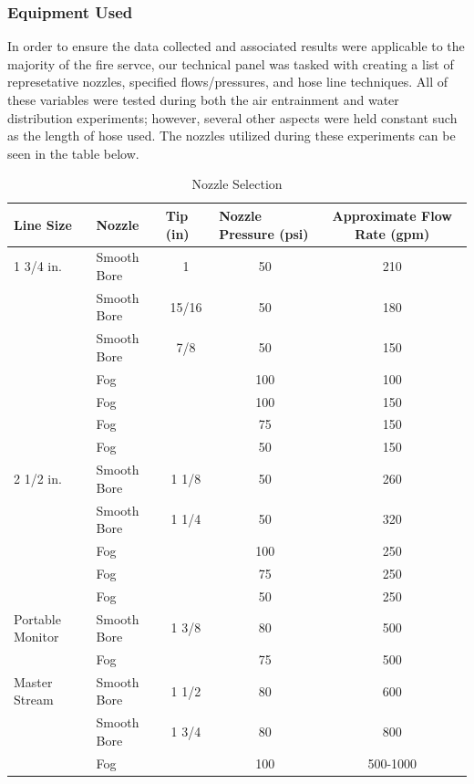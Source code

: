\documentclass{article}
\begin{document}
\clearpage

\subsubsection{Equipment Used}

In order to ensure the data collected and associated results were applicable to the majority of the fire servce, our technical panel was tasked with creating a list of represetative nozzles, specified flows/pressures, and hose line techniques. All of these variables were tested during both the air entrainment and water distribution experiments; however, several other aspects were held constant such as the length of hose used. The nozzles utilized during these experiments can be seen in the table below.

\begin{table}[]
\centering
\begin{tabular}{|llccc|}
\hline
\multicolumn{1}{|l|}{\textbf{Line Size}} & \multicolumn{1}{l|}{\textbf{Nozzle}} & \multicolumn{1}{l|}{\textbf{Tip (in)}} & \multicolumn{1}{l|}{\textbf{Nozzle Pressure (psi)}} & \textbf{Approximate Flow Rate (gpm)} \\ \hline
1 3/4 in. & Smooth Bore & 1 & 50 & 210 \\
 & Smooth Bore & 15/16 & 50 & 180 \\
 & Smooth Bore & 7/8 & 50 & 150 \\
 & Fog &  & 100 & 100 \\
 & Fog &  & 100 & 150 \\
 & Fog &  & 75 & 150 \\
 & Fog &  & 50 & 150 \\ \hline
2 1/2 in. & Smooth Bore & 1 1/8 & 50 & 260 \\
 & Smooth Bore & 1 1/4 & 50 & 320 \\
 & Fog &  & 100 & 250 \\
 & Fog &  & 75 & 250 \\
 & Fog &  & 50 & 250 \\ \hline
Portable Monitor & Smooth Bore & 1 3/8 & 80 & 500 \\
 & Fog &  & 75 & 500 \\ \hline
Master Stream & Smooth Bore & 1 1/2 & 80 & 600 \\
 & Smooth Bore & 1 3/4 & 80 & 800 \\
 & Fog &  & 100 & 500-1000 \\ \hline
\end{tabular}
\caption{Nozzle Selection}
\label{Nozzle Selection}
\end{table}
\end{document}
